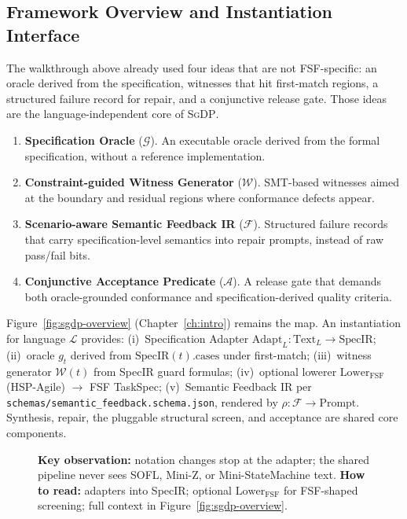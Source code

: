 \subsection{Framework Overview and Instantiation Interface}
\label{subsec:framework-overview}

The walkthrough above already used four ideas that are not FSF-specific:
an oracle derived from the specification, witnesses that hit first-match
regions, a structured failure record for repair, and a conjunctive release
gate.
Those ideas are the language-independent core of \textsc{SgDP}.

\begin{enumerate}
  \item \textbf{Specification Oracle} ($\mathcal{G}$).
    An executable oracle derived from the formal specification, without a
    reference implementation.
  \item \textbf{Constraint-guided Witness Generator} ($\mathcal{W}$).
    SMT-based witnesses aimed at the boundary and residual regions where
    conformance defects appear.
  \item \textbf{Scenario-aware Semantic Feedback IR} ($\mathcal{F}$).
    Structured failure records that carry specification-level semantics into
    repair prompts, instead of raw pass/fail bits.
  \item \textbf{Conjunctive Acceptance Predicate} ($\mathcal{A}$).
    A release gate that demands both oracle-grounded conformance and
    specification-derived quality criteria.
\end{enumerate}

Figure~\ref{fig:sgdp-overview} (Chapter~\ref{ch:intro}) remains the map.
An instantiation for language $\mathcal{L}$ provides:
(i)~Specification Adapter $\text{Adapt}_L : \text{Text}_L \to \text{SpecIR}$;
(ii)~oracle $g_t$ derived from $\text{SpecIR}(t).\text{cases}$ under first-match;
(iii)~witness generator $\mathcal{W}(t)$ from SpecIR guard formulas;
(iv)~optional lowerer $\text{Lower}_{\text{FSF}}$ (HSP-Agile) $\to$ FSF TaskSpec;
(v)~Semantic Feedback IR per \texttt{schemas/semantic\_feedback.schema.json},
    rendered by $\rho : \mathcal{F} \to \text{Prompt}$.
Synthesis, repair, the pluggable structural screen, and acceptance are
shared core components.

\begin{figure}[t]
  \centering
  \caption{\textbf{Key observation:} notation changes stop at the adapter;
    the shared pipeline never sees SOFL, Mini-Z, or Mini-StateMachine text.
    \textbf{How to read:} adapters into SpecIR; optional
    $\text{Lower}_{\text{FSF}}$ for FSF-shaped screening; full context in
    Figure~\ref{fig:sgdp-overview}.}
  \label{fig:specir-arch}
\end{figure}

